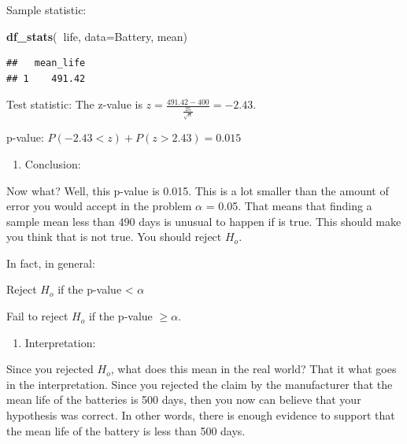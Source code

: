 \documentclass[]{book}
\newenvironment{Shaded}{\begin{snugshade}}{\end{snugshade}}
\newcommand{\DataTypeTok}[1]{\textcolor[rgb]{0.13,0.29,0.53}{#1}}
\newcommand{\KeywordTok}[1]{\textcolor[rgb]{0.13,0.29,0.53}{\textbf{#1}}}
\newcommand{\NormalTok}[1]{#1}
\newcommand{\OperatorTok}[1]{\textcolor[rgb]{0.81,0.36,0.00}{\textbf{#1}}}
\providecommand{\tightlist}{%
  \setlength{\itemsep}{0pt}\setlength{\parskip}{0pt}}
\begin{document}
Sample statistic:

\begin{Shaded}
\begin{Highlighting}[]
\KeywordTok{df_stats}\NormalTok{(}\OperatorTok{~}\NormalTok{life, }\DataTypeTok{data=}\NormalTok{Battery, mean)}
\end{Highlighting}
\end{Shaded}

\begin{verbatim}
##   mean_life
## 1    491.42
\end{verbatim}

Test statistic:
The z-value is \(z=\frac{491.42-400}{\frac{25}{\sqrt{n}}}=-2.43\).

p-value:
\(P(-2.43<z)+P(z>2.43)=0.015\)

\begin{enumerate}
\def\labelenumi{\arabic{enumi}.}
\setcounter{enumi}{4}
\tightlist
\item
  Conclusion:
\end{enumerate}

Now what? Well, this p-value is 0.015. This is a lot smaller than the amount of error you would accept in the problem \(\alpha\) = 0.05. That means that finding a sample mean less than 490 days is unusual to happen if is true. This should make you think that is not true. You should reject \(H_o\).

In fact, in general:

Reject \(H_o\) if the p-value \textless{} \(\alpha\)

Fail to reject \(H_o\) if the p-value \(\ge\alpha\).

\begin{enumerate}
\def\labelenumi{\arabic{enumi}.}
\setcounter{enumi}{5}
\tightlist
\item
  Interpretation:
\end{enumerate}

Since you rejected \(H_o\), what does this mean in the real world? That it what goes in the interpretation. Since you rejected the claim by the manufacturer that the mean life of the batteries is 500 days, then you now can believe that your hypothesis was correct. In other words, there is enough evidence to support that the mean life of the battery is less than 500 days.
\end{document}
